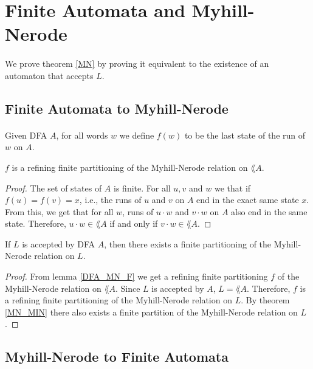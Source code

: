 \section{Finite Automata and Myhill-Nerode}

\paragraph{}
We prove theorem \ref{MN} by proving it equivalent to the existence of an automaton that accepts $L$.



\subsection{Finite Automata to Myhill-Nerode}
\paragraph{}
Given DFA $A$, for all words $w$ we define $f(w)$ to be the last state of the run of $w$ on $A$.

\begin{lemma} 
    \label{DFA_MN_F}
    $f$ is a refining finite partitioning of the Myhill-Nerode relation on $\lang{A}$. 
\end{lemma} 
\begin{proof} 
    The set of states of $A$ is finite.
    For all $u, v$ and $w$ we that if $f(u) = f(v) = x$, i.e.,
    the runs of $u$ and $v$ on $A$ end in the exact same state $x$.
    From this, we get that for all $w$, runs of $u \cdot w$ and $v \cdot w$ on $A$ also end in the same state.
    Therefore, $u\cdot w \in \lang{A}$ if and only if $v \cdot w \in \lang{A}$.
\end{proof}

\begin{theorem}
    If $L$ is accepted by DFA $A$, then there exists a finite partitioning of the Myhill-Nerode relation on $L$.
\end{theorem}
\begin{proof}
    From lemma \ref{DFA_MN_F} we get a refining finite partitioning $f$ of the Myhill-Nerode relation on $\lang{A}$. 
    Since $L$ is accepted by $A$, $L = \lang{A}$. 
    Therefore, $f$ is a refining finite partitioning of the Myhill-Nerode relation on $L$.
    By theorem \ref{MN_MIN} there also exists a finite partition of the Myhill-Nerode relation on $L$.
\end{proof}


\subsection{Myhill-Nerode to Finite Automata}

\paragraph{}


